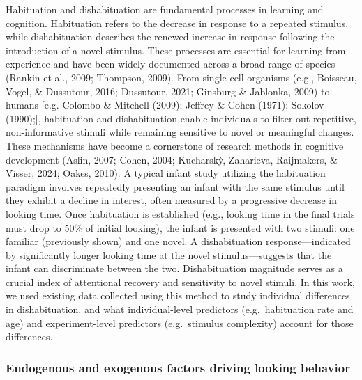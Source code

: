 \documentclass[10pt, letterpaper]{article}
\begin{document}
Habituation and dishabituation are fundamental processes in learning and
cognition. Habituation refers to the decrease in response to a repeated
stimulus, while dishabituation describes the renewed increase in
response following the introduction of a novel stimulus. These processes
are essential for learning from experience and have been widely
documented across a broad range of species (Rankin et al., 2009;
Thompson, 2009). From single-cell organisms (e.g., Boisseau, Vogel, \&
Dussutour, 2016; Dussutour, 2021; Ginsburg \& Jablonka, 2009) to humans
{[}e.g. Colombo \& Mitchell (2009); Jeffrey \& Cohen (1971); Sokolov
(1990);{]}, habituation and dishabituation enable individuals to filter
out repetitive, non-informative stimuli while remaining sensitive to
novel or meaningful changes. These mechanisms have become a cornerstone
of research methods in cognitive development (Aslin, 2007; Cohen, 2004;
Kucharskỳ, Zaharieva, Raijmakers, \& Visser, 2024; Oakes, 2010). A
typical infant study utilizing the habituation paradigm involves
repeatedly presenting an infant with the same stimulus until they
exhibit a decline in interest, often measured by a progressive decrease
in looking time. Once habituation is established (e.g., looking time in
the final trials must drop to 50\% of initial looking), the infant is
presented with two stimuli: one familiar (previously shown) and one
novel. A dishabituation response---indicated by significantly longer
looking time at the novel stimulus---suggests that the infant can
discriminate between the two. Dishabituation magnitude serves as a
crucial index of attentional recovery and sensitivity to novel stimuli.
In this work, we used existing data collected using this method to study
individual differences in dishabituation, and what individual-level
predictors (e.g.~habituation rate and age) and experiment-level
predictors (e.g.~stimulus complexity) account for those differences.

\hypertarget{endogenous-and-exogenous-factors-driving-looking-behavior}{%
\subsubsection{Endogenous and exogenous factors driving looking
behavior}\label{endogenous-and-exogenous-factors-driving-looking-behavior}}
\end{document}
